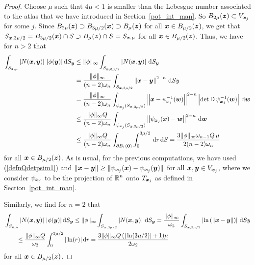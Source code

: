 \begin{proof}
 Choose $\mu$ such that $4\mu < 1$ is smaller than the Lebesgue
number associated to the atlas that we have introduced in
Section~\ref{pot_int_man}.  So $B_{2\mu}({\bm{z}}) \subset V_{{\bm{x}}_j}$
for some $j$.  Since $\displaystyle
B_{2\mu}({\bm{z}}) \supset B_{3\mu/2}({\bm{x}})
\supset B_{\mu}({\bm{z}})$ for all ${\bm{x}} \in B_{\mu/2}({\bm{z}})$, we
get that
$\displaystyle S_{{\bm{x}},3\mu/2} =  B_{3\mu/2}({\bm{x}}) \cap S
\supset B_{\mu}({\bm{z}}) \cap S = S_{{\bm{z}},\mu}$
for all ${\bm{x}} \in B_{\mu/2}({\bm{z}})$.
Thus, we have for $n>2$ that
\begin{align*}
\int_{S_{{\bm{z}},\mu}}\left| N({\bm{x}},{\bm{y}}) \right|\,
|\phi({\bm{y}})| \,\mathrm{d}{S}_{{\bm{y}}}
&\leq \|\phi\|_\infty \int_{S_{{\bm{x}},3\mu/2}} \left| N({\bm{x}},{\bm{y}}) \right|
\,\mathrm{d}{S}_{{\bm{y}}} \\
&= \frac{\|\phi\|_\infty}{(n-2)\omega_n}
\int_{S_{{\bm{x}},3\mu/2}} \left\| {\bm{x}} - {\bm{y}}\right\|^{2-n} \,\mathrm{d}{S}{y} \\
& = \frac{\|\phi\|_\infty}{(n-2)\omega_n}
\int_{\psi_{{\bm{x}}_j}(S_{{\bm{x}},3\mu/2})}
\left\| {\bm{x}} - \psi_{{\bm{x}}_j}^{-1}({\bm{w}})\right\|^{2-n}
\left| \det \operatorname{D} \psi_{{\bm{x}}_j}^{-1}({\bm{w}}) \right| \,\mathrm{d}{{\bm{w}}} \\
& \leq \frac{\|\phi\|_\infty Q}{(n-2)\omega_n}
\int_{\psi_{{\bm{x}}_j}(S_{{\bm{x}},3\mu/2})}
\left\| \psi_{{\bm{x}}_j}({\bm{x}}) - {\bm{w}}\right \|^{2-n} \,\mathrm{d}{{\bm{w}}} \\
& \leq \frac{\|\phi\|_\infty Q}{(n-2)\omega_n}
\int_{\partial B_1({\bm{0}})} \int_0^{3\mu/2} \,\mathrm{d}{r} \,\mathrm{d}{S}
= \frac{3\|\phi\|_\infty \omega_{n-1} Q\,\mu}{2(n-2)\omega_n}
\end{align*}
for all ${\bm{x}} \in B_{\mu/2}({\bm{z}})$.  As is usual, for the
previous computations, we have used (\ref{defnQdetpsim1})
and $\displaystyle \|{\bm{x}}-{\bm{y}}\|
\geq \|\psi_{{\bm{x}}_j}({\bm{x}}) - \psi_{{\bm{x}}_j}({\bm{y}})\|$ for all
$\displaystyle {\bm{x}},{\bm{y}} \in V_{{\bm{x}}_j}$, where we consider
$\psi_{{\bm{x}}_j}$ to be the projection of $\displaystyle \mathbb{R}^n$ onto
$T_{{\bm{x}}_j}$ as defined in Section~\ref{pot_int_man}.

Similarly, we find for $n=2$ that
\begin{align*}
&\int_{S_{{\bm{z}},\mu}}\left| N({\bm{x}},{\bm{y}}) \right|\,
|\phi({\bm{y}})| \,\mathrm{d}{S}_{{\bm{y}}}
\leq \|\phi\|_\infty \int_{S_{{\bm{x}},3\mu/2}} \left| N({\bm{x}},{\bm{y}}) \right|
\,\mathrm{d}{S}_{{\bm{y}}}
= \frac{\|\phi\|_\infty}{\omega_2}
\int_{S_{{\bm{x}},3\mu/2}}
\left| \ln\left( \left\| {\bm{x}} - {\bm{y}}\right\| \right) \right| \,\mathrm{d}{S}{y} \\
&\qquad \leq \frac{\|\phi\|_\infty Q}{\omega_2} \int_0^{3\mu/2} |\ln(r)| \,\mathrm{d}{r}
= \frac{3\|\phi\|_\infty Q\,(|\ln(3\mu/2)|+1) \mu}{2\omega_2}
\end{align*}
for all ${\bm{x}} \in B_{\mu/2}({\bm{z}})$.


\end{proof}
